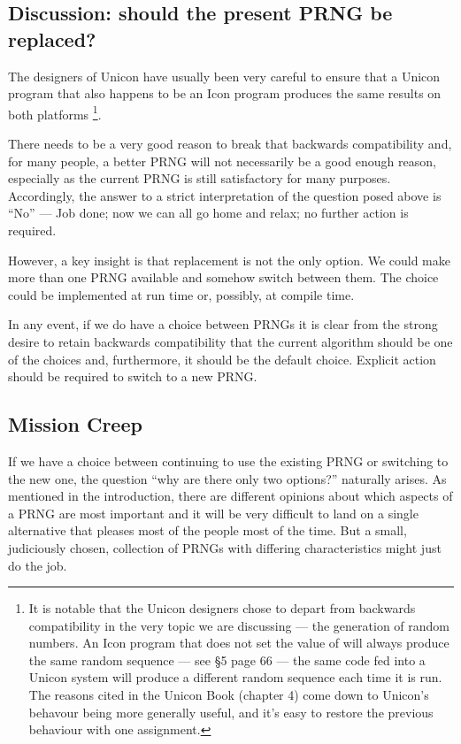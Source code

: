 \documentclass[letterpaper,12pt]{article}
\begin{document}
\subsection{Discussion: should the present PRNG be replaced?}

The designers of Unicon have usually been very careful to ensure that a
Unicon program that also happens to be an Icon program produces the same
results on both platforms%
\footnote{
  It is notable that the Unicon designers chose to depart from backwards
  compatibility in the very topic we are discussing --- the generation of
  random numbers. An Icon program that does not set the value of \rndkwd
  will always produce the same random sequence
  --- see \cite{IconBook} \S 5 page 66 ---
  the same code fed into a Unicon system will produce a different random
  sequence each time it is run. The reasons cited in the Unicon Book
  (chapter 4) come down to Unicon's behavour being more generally useful,
  and it's easy to restore the previous behaviour with one assignment.
}.

There needs to be a very good reason to break that backwards compatibility
and, for many people, a better PRNG will not necessarily be a good enough
reason, especially as the current PRNG is still satisfactory for many
purposes. Accordingly, the answer to a strict interpretation of the
question posed above is ``No'' --- Job done; now we can all go home and
relax; no further action is required.

However, a key insight is that replacement is not the only option. We could
make more than one PRNG available and somehow switch between them. The
choice could be implemented at run time or, possibly, at compile time.

In any event, if we do have a choice between PRNGs it is clear from the
strong desire to retain backwards compatibility that the current algorithm
should be one of the choices and, furthermore, it should be the default
choice. Explicit action should be required to switch to a new PRNG.

\subsection{Mission Creep}
If we have a choice between continuing to use the existing PRNG or
switching to the new one, the question ``why are there only two options?''
naturally arises. As mentioned in the introduction, there are different
opinions about which aspects of a PRNG are most important and it will be
very difficult to land on a single alternative that pleases most of the
people most of the time. But a small, judiciously chosen, collection
of PRNGs with differing characteristics might just do the job.
\end{document}

